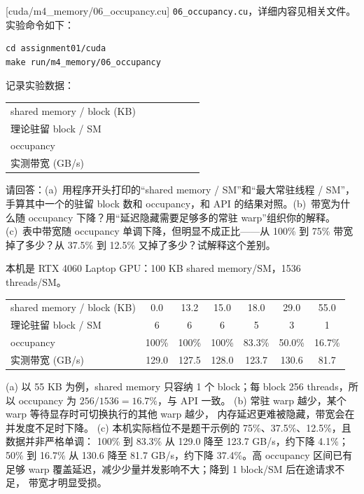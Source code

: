 \documentclass[11pt,a4paper,fontset=fandol]{ctexart}
\begin{document}
[cuda/m4\_memory/06\_occupancy.cu]
\texttt{06\_occupancy.cu}，详细内容见相关文件。实验命令如下：

\begin{lstlisting}
cd assignment01/cuda
make run/m4_memory/06_occupancy
\end{lstlisting}

记录实验数据：

\begin{center}\small
\begin{tabular}{@{}lcccccc@{}}
\toprule
shared memory / block (KB) & & & & & & \\
理论驻留 block / SM & & & & & & \\
occupancy & & & & & & \\
实测带宽 (GB/s) & & & & & & \\
\bottomrule
\end{tabular}
\end{center}

请回答：(a)~用程序开头打印的“shared memory / SM”和“最大常驻线程 / SM”，手算其中一个的驻留 block 数和 occupancy，和 API 的结果对照。(b)~带宽为什么随 occupancy 下降？用“延迟隐藏需要足够多的常驻 warp”组织你的解释。(c)~表中带宽随 occupancy 单调下降，但明显不成正比——从 100\% 到 75\% 带宽掉了多少？从 37.5\% 到 12.5\% 又掉了多少？试解释这个差别。

\begin{answer}
本机是 RTX 4060 Laptop GPU：100 KB shared memory/SM，1536
threads/SM。
\begin{center}\small
\begin{tabular}{@{}lcccccc@{}}
\toprule
shared memory / block (KB) & 0.0 & 13.2 & 15.0 & 18.0 & 29.0 & 55.0 \\
理论驻留 block / SM & 6 & 6 & 6 & 5 & 3 & 1 \\
occupancy & 100\% & 100\% & 100\% & 83.3\% & 50.0\% & 16.7\% \\
实测带宽 (GB/s) & 129.0 & 127.5 & 128.0 & 123.7 & 130.6 & 81.7 \\
\bottomrule
\end{tabular}
\end{center}
(a) 以 55 KB 为例，shared memory 只容纳 1 个 block；每 block 256
threads，所以 occupancy 为 $256/1536=16.7\%$，与 API 一致。
(b) 常驻 warp 越少，某个 warp 等待显存时可切换执行的其他 warp 越少，
内存延迟更难被隐藏，带宽会在并发度不足时下降。
(c) 本机实际档位不是题干示例的 75\%、37.5\%、12.5\%，且数据并非严格单调：
100\% 到 83.3\% 从 129.0 降至 123.7 GB/s，约下降 4.1\%；50\% 到
16.7\% 从 130.6 降至 81.7 GB/s，约下降 37.4\%。高 occupancy 区间已有
足够 warp 覆盖延迟，减少少量并发影响不大；降到 1 block/SM 后在途请求不足，
带宽才明显受损。
\end{answer}
\end{document}
